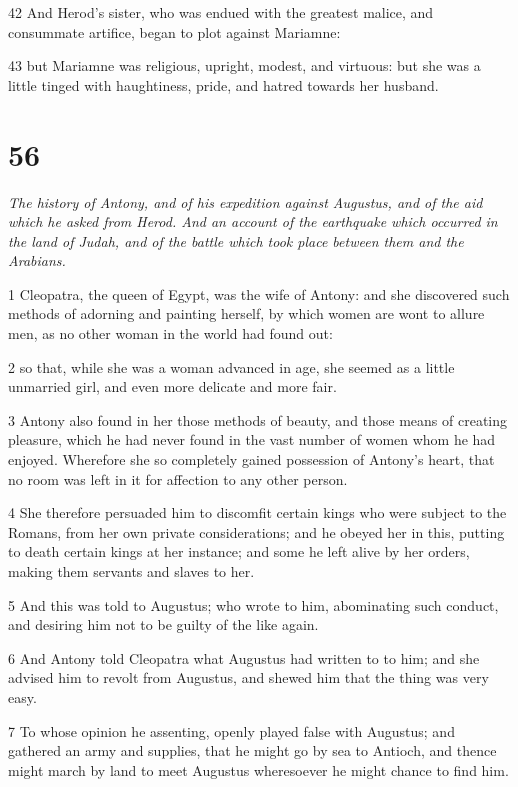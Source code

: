 42 And Herod’s sister, who was endued with the greatest malice, and consummate artifice, began to plot against Mariamne: 

43 but Mariamne was religious, upright, modest, and virtuous: but she was a little tinged with haughtiness, pride, and hatred towards her husband.

\chapter{56}

\par \textit{The history of Antony, and of his expedition against Augustus, and of the aid which he asked from Herod. And an account of the earthquake which occurred in the land of Judah, and of the battle which took place between them and the Arabians.}

1 Cleopatra, the queen of Egypt, was the wife of Antony: and she discovered such methods of adorning and painting herself, by which women are wont to allure men, as no other woman in the world had found out: 

2 so that, while she was a woman advanced in age, she seemed as a little unmarried girl, and even more delicate and more fair. 

3 Antony also found in her those methods of beauty, and those means of creating pleasure, which he had never found in the vast number of women whom he had enjoyed. Wherefore she so completely gained possession of Antony’s heart, that no room was left in it for affection to any other person. 

4 She therefore persuaded him to discomfit certain kings who were subject to the Romans, from her own private considerations; and he obeyed her in this, putting to death certain kings at her instance; and some he left alive by her orders, making them servants and slaves to her.

5 And this was told to Augustus; who wrote to him, abominating such conduct, and desiring him not to be guilty of the like again. 

6 And Antony told Cleopatra what Augustus had written to to him; and she advised him to revolt from Augustus, and shewed him that the thing was very easy.

7 To whose opinion he assenting, openly played false with Augustus; and gathered an army and supplies, that he might go by sea to Antioch, and thence might march by land to meet Augustus wheresoever he might chance to find him. 


